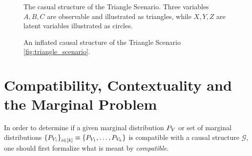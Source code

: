 \documentclass[aps, 10pt, english, twoside, pra, nofootinbib, longbibliography]{revtex4-1}
\theoremstyle{plain}
\theoremstyle{definition}
\theoremstyle{remark}
\newcommand{\graph}{\mathcal{G}}
\begin{document}
    \begin{figure}
    \begin{center}
        \begin{minipage}[b]{.48\textwidth}
            \centering
            \scalebox{1.0}{}
            \caption{The casual structure of the Triangle Scenario. Three variables $A,B,C$ are observable and illustrated as triangles, while $X, Y, Z$ are latent variables illustrated as circles.}
            \label{fig:triangle_scenario}
        \end{minipage}\hspace{0.04\textwidth}%
        \begin{minipage}[b]{.48\textwidth}
            \centering
            \scalebox{0.8}{}
            \caption{An inflated causal structure of the Triangle Scenario \cref{fig:triangle_scenario}.}
            \label{fig:inflated_triangle_scenario}
        \end{minipage}
    \end{center}
    \end{figure}

    \section{Compatibility, Contextuality and the Marginal Problem}
    \label{sec:comp_con_mp}
    In order to determine if a given marginal distribution $\prob[V]$ or set of marginal distributions $\bc{\prob[V_i]}_{i \in \bs{k}} \defined \bc{\prob[V_1], \ldots, \prob[V_k]}$ is compatible with a causal structure $\graph$, one should first formalize what is meant by \textit{compatible}.
\end{document}
